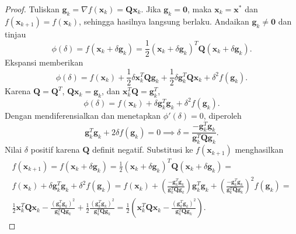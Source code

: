 \begin{proof} Tuliskan $\mathbf{g}_k=\nabla f(\mathbf{x}_k)=\mathbf{Q}\mathbf{x}_k$. Jika $\mathbf{g}_k=\mathbf{0}$, maka $\mathbf{x}_k=\mathbf{x}^*$ dan $f(\mathbf{x}_{k+1})=f(\mathbf{x}_k)$, sehingga hasilnya langsung berlaku. Andaikan $\mathbf{g}_k\neq\mathbf{0}$ dan tinjau
\begin{equation}
\phi(\delta)=f(\mathbf{x}_k+\delta\mathbf{g}_k)
=\frac{1}{2}(\mathbf{x}_k+\delta\mathbf{g}_k)^T
\mathbf{Q}(\mathbf{x}_k+\delta\mathbf{g}_k).
\end{equation}
Ekspansi memberikan
\begin{equation}
\phi(\delta)=f(\mathbf{x}_k)
+\frac{1}{2}\delta\mathbf{x}_k^T\mathbf{Q}\mathbf{g}_k
+\frac{1}{2}\delta\mathbf{g}_k^T\mathbf{Q}\mathbf{x}_k
+\delta^2 f(\mathbf{g}_k).
\end{equation}
Karena $\mathbf{Q}=\mathbf{Q}^T$, $\mathbf{Q}\mathbf{x}_k=\mathbf{g}_k$, dan $\mathbf{x}_k^T\mathbf{Q}=\mathbf{g}_k^T$,
\begin{equation}
\phi(\delta)=f(\mathbf{x}_k)+\delta\mathbf{g}_k^T\mathbf{g}_k
+\delta^2f(\mathbf{g}_k).
\end{equation}
Dengan mendiferensialkan dan menetapkan $\phi'(\delta)=0$, diperoleh
\begin{equation}
\mathbf{g}_k^T\mathbf{g}_k+2\delta f(\mathbf{g}_k)=0
\implies
\delta=\frac{-\mathbf{g}_k^T\mathbf{g}_k}
{\mathbf{g}_k^T\mathbf{Q}\mathbf{g}_k}.
\end{equation}
Nilai $\delta$ positif karena $\mathbf{Q}$ definit negatif. Substitusi ke $f(\mathbf{x}_{k+1})$ menghasilkan
\begin{multline}
f(\mathbf{x}_{k+1})=f(\mathbf{x}_k+\delta\mathbf{g}_k)
=\frac{1}{2}(\mathbf{x}_k+\delta\mathbf{g}_k)^T\mathbf{Q}(\mathbf{x}_k+\delta\mathbf{g}_k)=\\
f(\mathbf{x}_k)+\delta\mathbf{g}_k^T\mathbf{g}_k+\delta^2f(\mathbf{g}_k)=
f(\mathbf{x}_k)+
\left(\frac{-\mathbf{g}_k^T\mathbf{g}_k}{\mathbf{g}_k^T\mathbf{Q}\mathbf{g}_k}\right)
\mathbf{g}_k^T\mathbf{g}_k
+\left(\frac{-\mathbf{g}_k^T\mathbf{g}_k}{\mathbf{g}_k^T\mathbf{Q}\mathbf{g}_k}\right)^2
f(\mathbf{g}_k)=\\
\frac{1}{2}\mathbf{x}_k^T\mathbf{Q}\mathbf{x}_k
-\frac{(\mathbf{g}_k^T\mathbf{g}_k)^2}{\mathbf{g}_k^T\mathbf{Q}\mathbf{g}_k}
+\frac{1}{2}\frac{(\mathbf{g}_k^T\mathbf{g}_k)^2}{\mathbf{g}_k^T\mathbf{Q}\mathbf{g}_k}
=\frac{1}{2}\left(
\mathbf{x}_k^T\mathbf{Q}\mathbf{x}_k
-\frac{(\mathbf{g}_k^T\mathbf{g}_k)^2}{\mathbf{g}_k^T\mathbf{Q}\mathbf{g}_k}
\right).
\end{multline}

\end{proof}

